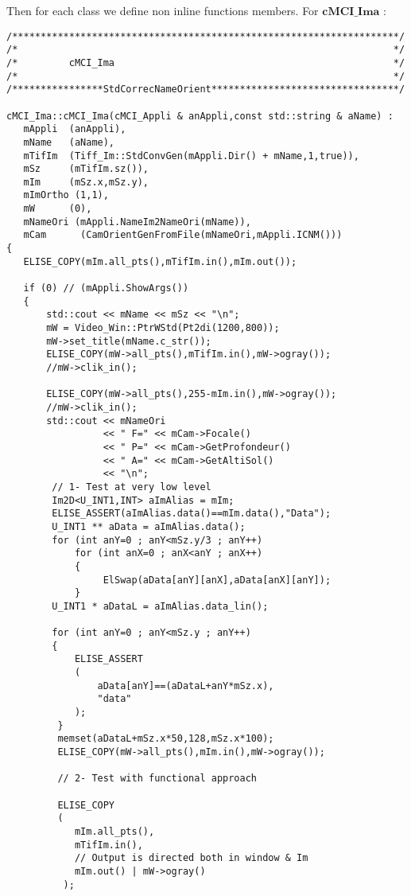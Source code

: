 \documentclass[a4paper]{book}
\begin{document}
Then for each class we define non inline functions members. For $\textbf{cMCI\_Ima}$ :
\begin{lstlisting}
/********************************************************************/
/*                                                                  */
/*         cMCI_Ima                                                 */
/*                                                                  */
/****************StdCorrecNameOrient*********************************/

cMCI_Ima::cMCI_Ima(cMCI_Appli & anAppli,const std::string & aName) :
   mAppli  (anAppli),
   mName   (aName),
   mTifIm  (Tiff_Im::StdConvGen(mAppli.Dir() + mName,1,true)),
   mSz     (mTifIm.sz()),
   mIm     (mSz.x,mSz.y),
   mImOrtho (1,1),
   mW      (0),
   mNameOri (mAppli.NameIm2NameOri(mName)),
   mCam      (CamOrientGenFromFile(mNameOri,mAppli.ICNM()))
{
   ELISE_COPY(mIm.all_pts(),mTifIm.in(),mIm.out());

   if (0) // (mAppli.ShowArgs())
   {
       std::cout << mName << mSz << "\n";
       mW = Video_Win::PtrWStd(Pt2di(1200,800));
       mW->set_title(mName.c_str());
       ELISE_COPY(mW->all_pts(),mTifIm.in(),mW->ogray());
       //mW->clik_in();

       ELISE_COPY(mW->all_pts(),255-mIm.in(),mW->ogray());
       //mW->clik_in();
       std::cout << mNameOri
                 << " F=" << mCam->Focale()
                 << " P=" << mCam->GetProfondeur()
                 << " A=" << mCam->GetAltiSol()
                 << "\n";
        // 1- Test at very low level
        Im2D<U_INT1,INT> aImAlias = mIm;
        ELISE_ASSERT(aImAlias.data()==mIm.data(),"Data");
        U_INT1 ** aData = aImAlias.data();
        for (int anY=0 ; anY<mSz.y/3 ; anY++)
            for (int anX=0 ; anX<anY ; anX++)
            {
                 ElSwap(aData[anY][anX],aData[anX][anY]);
            }
        U_INT1 * aDataL = aImAlias.data_lin();

        for (int anY=0 ; anY<mSz.y ; anY++)
        {
            ELISE_ASSERT
            (
                aData[anY]==(aDataL+anY*mSz.x),
                "data"
            );
         }
         memset(aDataL+mSz.x*50,128,mSz.x*100);
         ELISE_COPY(mW->all_pts(),mIm.in(),mW->ogray());

         // 2- Test with functional approach

         ELISE_COPY
         (
            mIm.all_pts(),
            mTifIm.in(),
            // Output is directed both in window & Im
            mIm.out() | mW->ogray()
          );


\end{lstlisting}
\end{document}
